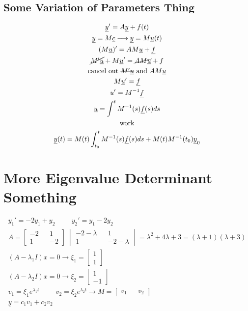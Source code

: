 \documentclass[fleqn]{report}
\newcommand{\hp}{\hspace{1cm}}
\newcommand{\equations} [1] {
\begin{gather*}
#1
\end{gather*}
}
\begin{document}
\subsection{Some Variation of Parameters Thing}
\equations{
\underline y' = A \underline y + f(t)
\\
\underline y = M \underline c \longrightarrow \underline y = M \underline u(t)
\\
(M \underline u)' = A M \underline u + \underline f
\\
\cancel{M' \underline u} + M \underline u' = \cancel{A M \underline u} + f
\\
\textrm{cancel out \sout{$M' \underline u$} and $A M \underline u$}
\\
M \underline u' = \underline f
\\
u' = M^{-1} \underline f
\\
\underline u = \int^t M^{-1} (s) \underline f(s) ds
\\
\textrm{work}
\\
\underline y(t) = M(t) \int^t_{t_0} M^{-1}(s) \underline f(s) ds + M(t) M^{-1} (t_0) \underline y_0
}

\section{More Eigenvalue Determinant Something}
\equations{
y_1' = -2y_1 + y_2 \hp y_2' = y_1 - 2y_2
\\
A =
\begin{bmatrix}
-2 && 1 \\
1 && -2 
\end{bmatrix}
\
\begin{vmatrix}
-2 - \lambda && 1 \\
1 && -2 - \lambda
\end{vmatrix}
=
\lambda^2 + 4 \lambda + 3 = (\lambda + 1)(\lambda + 3)
\\
(A - \lambda_1I)x = 0 
\rightarrow
\xi_1 = 
\begin{bmatrix}
1 \\
1 
\end{bmatrix}
\\
(A - \lambda_2 I)x = 0 
\rightarrow
\xi_2 = 
\begin{bmatrix}
1 \\
-1
\end{bmatrix}
\\
v_1 = \xi_1 e^{\lambda_1 t}
\hp
v_2 = \xi_2 e^{\lambda_2 t}
\rightarrow
M = 
\begin{bmatrix}
v_1 && v_2
\end{bmatrix}
\\
\underline y = c_1 v_1 + c_2 v_2
}
\end{document}
